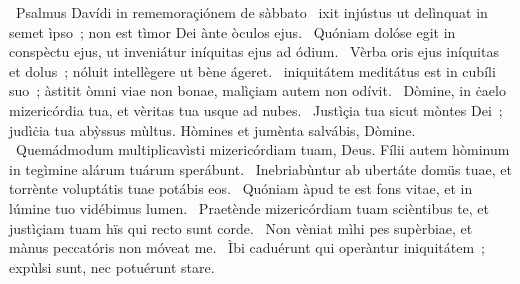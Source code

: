 {~Psalmus Davídi in rememoraçiónem de sàbbato}
{%
~ixit injústus ut delìnquat in semet ìpso~; non est tìmor Dei ànte òculos ejus.
~Quóniam dolóse egit in conspèctu ejus, ut inveniátur iníquitas ejus ad ódium.
~Vèrba oris ejus iníquitas et dolus~; nóluit intellègere ut bène ágeret.
~iniquitátem meditátus est in cubíli suo~; àstitit òmni viae non bonae, malìçiam autem non odívit.
~Dòmine, in ċaelo mizericórdia tua, et vèritas tua usque ad nubes.
~Justìçia tua sicut mòntes Dei~; judìċia tua abỳssus mùltus. Hòmines et jumènta salvábis, Dòmine.
~Quemádmodum multiplicavìsti mizericórdiam tuam, Deus. Fílii autem hòminum in tegìmine alárum tuárum sperábunt.
~Inebriabùntur ab ubertáte domüs tuae, et torrènte voluptátis tuae potábis eos.
~Quóniam àpud te est fons vitae, et in lúmine tuo vidébimus lumen.
~Praetènde mizericórdiam tuam scièntibus te, et justìçiam tuam hïs qui recto sunt corde.
~Non vèniat mìhi pes supèrbiae, et mànus peccatóris non móveat me.
~Ìbi caduérunt qui operàntur iniquitátem~; expùlsi sunt, nec potuérunt stare.
}
